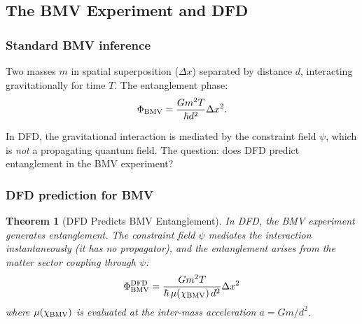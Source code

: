 \documentclass[11pt,a4paper]{article}
\newtheorem{theorem}{Theorem}
\begin{document}
\subsection{The BMV Experiment and DFD}

\subsubsection{Standard BMV inference}

Two masses $m$ in spatial superposition ($\Delta x$) separated by distance $d$, interacting gravitationally for time $T$. The entanglement phase:
\begin{equation}
\Phi_{\rm BMV} = \frac{Gm^2 T}{\hbar d^2}\Delta x^2.
\end{equation}

In DFD, the gravitational interaction is mediated by the constraint field $\psi$, which is \emph{not} a propagating quantum field. The question: does DFD predict entanglement in the BMV experiment?

\subsubsection{DFD prediction for BMV}

\begin{theorem}[DFD Predicts BMV Entanglement]
In DFD, the BMV experiment generates entanglement. The constraint field $\psi$ mediates the interaction instantaneously (it has no propagator), and the entanglement arises from the \emph{matter sector} coupling through $\psi$:
\begin{equation}
\Phi_{\rm BMV}^{\rm DFD} = \frac{Gm^2 T}{\hbar\,\mu(\chi_{\rm BMV})\,d^2}\Delta x^2
\end{equation}
where $\mu(\chi_{\rm BMV})$ is evaluated at the inter-mass acceleration $a = Gm/d^2$.
\end{theorem}
\end{document}
